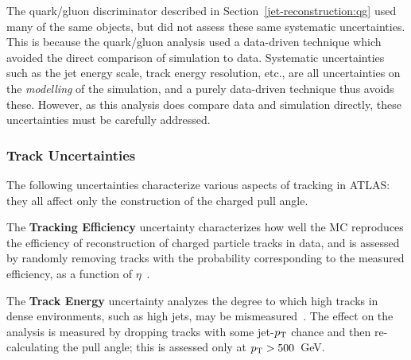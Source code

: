 The quark/gluon discriminator described in Section~\ref{jet-reconstruction:qg} used many of the same objects, but did not assess these same systematic uncertainties. This is because the quark/gluon analysis used a data-driven technique which avoided the direct comparison of simulation to data. Systematic uncertainties such as the jet energy scale, track energy resolution, etc., are all uncertainties on the \textit{modelling} of the simulation, and a purely data-driven technique thus avoids these. However, as this analysis does compare data and simulation directly, these uncertainties must be carefully addressed.

	\subsubsection{Track Uncertainties}
	\label{chapter:color:uncertainties:tracks}

	The following uncertainties characterize various aspects of tracking in ATLAS: they all affect only the construction of the charged pull angle.

	The \textbf{Tracking Efficiency} uncertainty characterizes how well the MC reproduces the efficiency of reconstruction of charged particle tracks in data, and is assessed by randomly removing tracks with the probability corresponding to the measured efficiency, as a function of $\eta$~\cite{ATLASCharged}. %


	The \textbf{Track Energy} uncertainty analyzes the degree to which high \pt tracks in dense environments, such as high \pt jets, may be mismeasured~\cite{trackuncerts}. The effect on the analysis is measured by dropping tracks with some jet-$p_{\text{T}}$ chance and then re-calculating the pull angle; this is assessed only at $p_{\text{T}} > 500$~GeV.%


